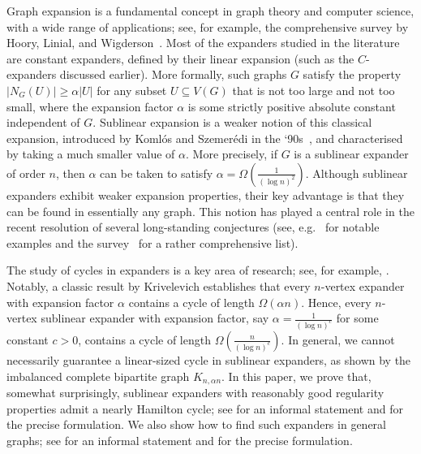 \documentclass[10pt]{article}
\theoremstyle{plain}
\numberwithin{theorem}{section}
\theoremstyle{definition}
\theoremstyle{remark}
\theoremstyle{plain}
\begin{document}
	Graph expansion is a fundamental concept in graph theory and computer science, with a wide range of applications; see, for example, the comprehensive survey by Hoory, Linial, and Wigderson~\cite{hoory2006expander}. Most of the expanders studied in the literature are constant expanders, defined by their linear expansion (such as the $C$-expanders discussed earlier). More formally, such graphs $G$ satisfy the property $|N_G(U)| \geq \alpha |U|$ for any subset $U \subseteq V(G)$ that is not too large and not too small, where the expansion factor $\alpha$ is some strictly positive absolute constant independent of $G$.  Sublinear expansion is a weaker notion of this classical expansion, introduced by Koml\'os and Szemer\'edi in the `90s~\cite{komlos1994topological, komlos1996topological}, and characterised by taking a much smaller value of $\alpha$. More precisely, if $G$ is a sublinear expander of order $n$, then $\alpha$ can be taken to satisfy $\alpha = \Omega(\frac{1}{(\log n)^2})$. Although sublinear expanders exhibit weaker expansion properties, their key advantage is that they can be found in essentially any graph. This notion has played a central role in the recent resolution of several long-standing conjectures (see, e.g.\ \cite{alon2023essentially, liu2017proof,liu2023solution,bucic2022erdos,montgomery2023proof, chakraborti2024edge} for notable examples and the survey~\cite{letzter2024sublinear} for a rather comprehensive list).

The study of cycles in expanders is a key area of research; see, for example, \cite{friedman2021cycle, MR3967294, haslegrave2022crux}. Notably, a classic result by Krivelevich \cite{krivelevich2019long} establishes that every $n$-vertex expander with expansion factor $\alpha$ contains a cycle of length $\Omega(\alpha n)$. Hence, every $n$-vertex sublinear expander with expansion factor, say $\alpha = \frac{1}{(\log n)^c}$ for some constant $c>0$, contains a cycle of length $\Omega(\frac{n}{(\log n)^c})$. In general, we cannot necessarily guarantee a linear-sized cycle in sublinear expanders, as shown by the imbalanced complete bipartite graph $K_{n, \alpha n}$. In this paper, we prove that, somewhat surprisingly, sublinear expanders with reasonably good regularity properties admit a nearly Hamilton cycle; see  for an informal statement and  for the precise formulation. We also show how to find such expanders in general graphs; see  for an informal statement and  for the precise formulation.
\end{document}
